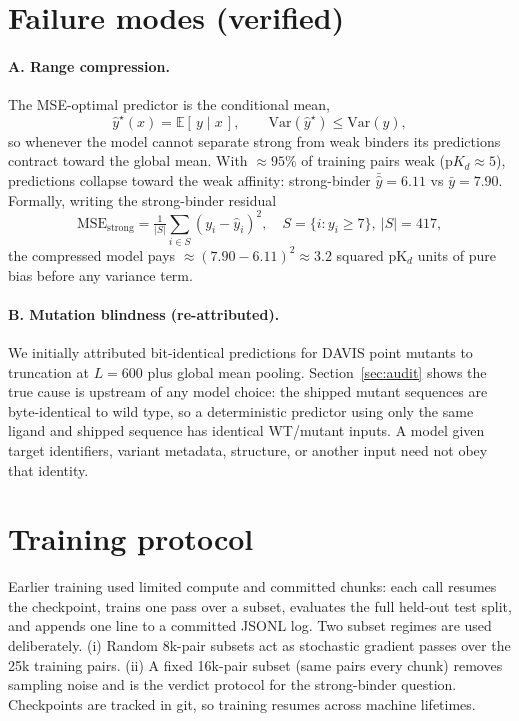 \documentclass[11pt]{article}
\begin{document}
\section{Failure modes (verified)}
\paragraph{A. Range compression.} The MSE-optimal predictor is the
conditional mean,
\begin{equation}
  \hat y^{\star}(x) = \mathbb{E}[\,y \mid x\,], \qquad
  \mathrm{Var}(\hat y^{\star}) \le \mathrm{Var}(y),
\end{equation}
so whenever the model cannot separate strong from weak binders its
predictions contract toward the global mean. With $\approx 95\%$ of
training pairs weak ($\mathrm{p}K_d \approx 5$), predictions collapse
toward the weak affinity: strong-binder $\bar{\hat y} = 6.11$ vs
$\bar y = 7.90$. Formally, writing the strong-binder residual
\begin{equation}
  \mathrm{MSE}_{\mathrm{strong}} = \tfrac{1}{|S|} \sum_{i \in S}
  (y_i - \hat y_i)^2, \quad S = \{ i : y_i \ge 7 \},\ |S| = 417,
\end{equation}
the compressed model pays $\approx (7.90 - 6.11)^2 \approx 3.2$ squared
pK$_d$ units of pure bias before any variance term.
\paragraph{B. Mutation blindness (re-attributed).} We initially attributed
bit-identical predictions for DAVIS point mutants to truncation at
$L=600$ plus global mean pooling. Section~\ref{sec:audit} shows the true
cause is upstream of any model choice: the shipped mutant sequences are
byte-identical to wild type, so a deterministic predictor using only the same ligand and shipped
sequence has identical WT/mutant inputs. A model given target identifiers,
variant metadata, structure, or another input need not obey that identity.

\section{Training protocol}
Earlier training used limited compute and committed chunks: each call
resumes the checkpoint, trains one pass over a subset, evaluates the full
held-out test split, and appends one line to a committed JSONL log. Two
subset regimes are used deliberately. (i) Random 8k-pair subsets act as
stochastic gradient passes over the 25k training pairs. (ii) A fixed
16k-pair subset (same pairs every chunk) removes sampling noise and is the
verdict protocol for the strong-binder question. Checkpoints are tracked in
git, so training resumes across machine lifetimes.
\end{document}
